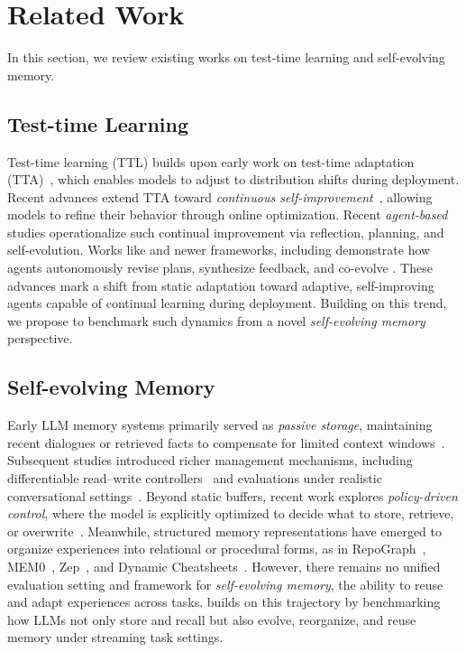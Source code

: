 \section{Related Work}


In this section, we review existing works on test-time learning and self-evolving memory. 

\subsection{Test-time Learning}
Test-time learning (TTL) builds upon early work on test-time adaptation (TTA)~\citep{wang2021tent,niu2022efficient,zhang2023memo}, which enables models to adjust to distribution shifts during deployment. Recent advances extend TTA toward \emph{continuous self-improvement}~\citep{iwasawa2021t3a,liu2023tttpp}, allowing models to refine their behavior through online optimization.
Recent \emph{agent-based} studies operationalize such continual improvement via reflection, planning, and self-evolution. Works like \citep{shinn2023reflexion,wang2023voyager,zhou2024eureka,park2023generative,zhao2025selfevolving} and newer frameworks, including \citep{huang2025selfdiscovering,chen2025llmasoptimizer} demonstrate how agents autonomously revise plans, synthesize feedback, and co-evolve \citep{gao2025selfevolvingagents}. These advances mark a shift from static adaptation toward adaptive, self-improving agents capable of continual learning during deployment. Building on this trend, we propose to benchmark such dynamics from a novel \emph{self-evolving memory} perspective.


\subsection{Self-evolving Memory}
Early LLM memory systems primarily served as \emph{passive storage}, maintaining recent dialogues or retrieved facts to compensate for limited context windows~\citep{DBLP:conf/nips/LewisPPPKGKLYR020,DBLP:conf/iclr/AsaiWWSH24,Zhong2023MemoryBankEL,Liu_LlamaIndex_2022,Packer2023MemGPTTL}. Subsequent studies introduced richer management mechanisms, including differentiable read–write controllers~\citep{Modarressi2023RETLLMTA,Liang2023SCMEL} and evaluations under realistic conversational settings~\citep{Maharana2024EvaluatingVL,Wu2024LongMemEvalBC}. Beyond static buffers, recent work explores \emph{policy-driven control}, where the model is explicitly optimized to decide what to store, retrieve, or overwrite~\citep{yu2025memagent,xu2025mem,zhou2025mem1,yan2025memory,Li2025MemOSAO}. Meanwhile, structured memory representations have emerged to organize experiences into relational or procedural forms, as in RepoGraph~\citep{Ouyang2024RepoGraphEA}, MEM0~\citep{mem0}, Zep~\citep{Rasmussen2025ZepAT}, and Dynamic Cheatsheets~\citep{suzgun2025dynamic}. However, there remains no unified evaluation setting and framework for \emph{self-evolving memory}, the ability to reuse and adapt experiences across tasks. \method builds on this trajectory by benchmarking how LLMs not only store and recall but also evolve, reorganize, and reuse memory under streaming task settings.